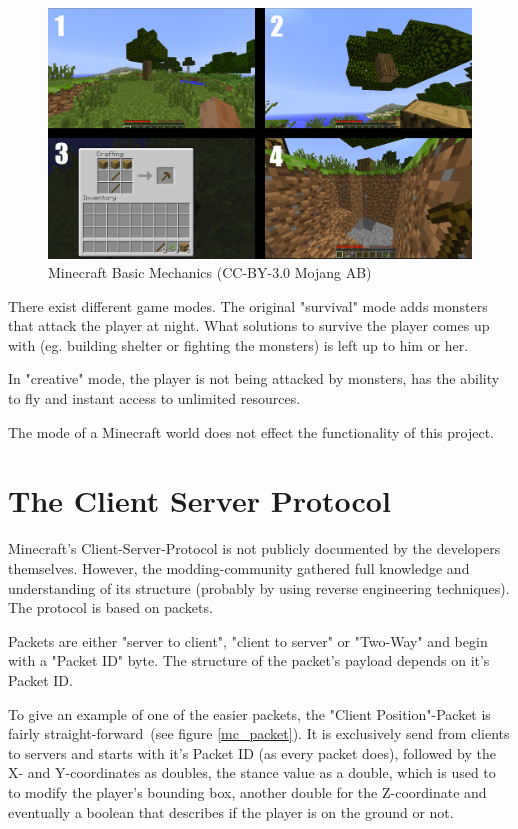 \begin{figure}[h]
  \centering
    \includegraphics[width=15cm]{graphics/minecraft_mechanics}
  \caption{Minecraft Basic Mechanics  (CC-BY-3.0 Mojang AB)} %
  \label{mc_mechanics}
\end{figure}

There exist different game modes. The original "survival" mode adds monsters that attack the player at night. What solutions to survive the player comes up with (eg. building shelter or fighting the monsters) is left up to him or her.

In "creative" mode, the player is not being attacked by monsters, has the ability to fly and instant access to unlimited resources.

The mode of a Minecraft world does not effect the functionality of this project.

        \section{The Client Server Protocol}
Minecraft's Client-Server-Protocol is not publicly documented by the developers themselves. However, the modding-community gathered full knowledge and understanding of its structure (probably by using reverse engineering techniques). The protocol is based on packets. 


Packets are either "server to client", "client to server" or "Two-Way" and begin with a "Packet ID" byte. The structure of the packet's payload depends on it's Packet ID.
 
To give an example of one of the easier packets, the "Client Position"-Packet is fairly straight-forward~(see figure \ref{mc_packet}). It is exclusively send from clients to servers and starts with it's Packet ID (as every packet does), followed by the X- and Y-coordinates as doubles, the stance value as a double, which is used to to modify the player's bounding box, another double for the Z-coordinate and eventually a boolean that describes if the player is on the ground or not.~\cite{protocol}

